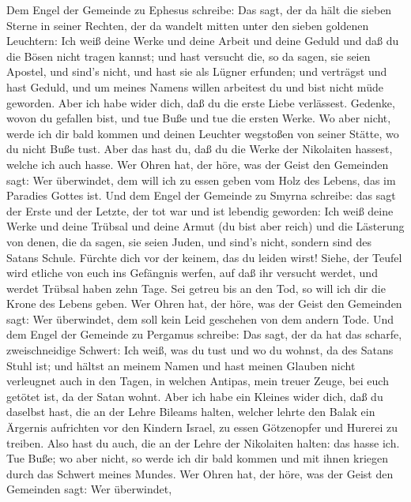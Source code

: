  Dem Engel der Gemeinde zu Ephesus schreibe: Das sagt, der
da hält die sieben Sterne in seiner Rechten, der da wandelt mitten unter
den sieben goldenen Leuchtern:  Ich weiß deine Werke und
deine Arbeit und deine Geduld und daß du die Bösen nicht tragen kannst;
und hast versucht die, so da sagen, sie seien Apostel, und sind's nicht,
und hast sie als Lügner erfunden;  und verträgst und hast
Geduld, und um meines Namens willen arbeitest du und bist nicht müde
geworden.  Aber ich habe wider dich, daß du die erste Liebe
verlässest.  Gedenke, wovon du gefallen bist, und tue Buße
und tue die ersten Werke. Wo aber nicht, werde ich dir bald kommen und
deinen Leuchter wegstoßen von seiner Stätte, wo du nicht Buße tust.
 Aber das hast du, daß du die Werke der Nikolaiten hassest,
welche ich auch hasse.  Wer Ohren hat, der höre, was der
Geist den Gemeinden sagt: Wer überwindet, dem will ich zu essen geben
vom Holz des Lebens, das im Paradies Gottes ist.  Und dem
Engel der Gemeinde zu Smyrna schreibe: das sagt der Erste und der
Letzte, der tot war und ist lebendig geworden:  Ich weiß
deine Werke und deine Trübsal und deine Armut (du bist aber reich) und
die Lästerung von denen, die da sagen, sie seien Juden, und sind's
nicht, sondern sind des Satans Schule.  Fürchte dich vor
der keinem, das du leiden wirst! Siehe, der Teufel wird etliche von euch
ins Gefängnis werfen, auf daß ihr versucht werdet, und werdet Trübsal
haben zehn Tage. Sei getreu bis an den Tod, so will ich dir die Krone
des Lebens geben.  Wer Ohren hat, der höre, was der Geist
den Gemeinden sagt: Wer überwindet, dem soll kein Leid geschehen von dem
andern Tode.  Und dem Engel der Gemeinde zu Pergamus
schreibe: Das sagt, der da hat das scharfe, zweischneidige Schwert:
 Ich weiß, was du tust und wo du wohnst, da des Satans
Stuhl ist; und hältst an meinem Namen und hast meinen Glauben nicht
verleugnet auch in den Tagen, in welchen Antipas, mein treuer Zeuge, bei
euch getötet ist, da der Satan wohnt.  Aber ich habe ein
Kleines wider dich, daß du daselbst hast, die an der Lehre Bileams
halten, welcher lehrte den Balak ein Ärgernis aufrichten vor den Kindern
Israel, zu essen Götzenopfer und Hurerei zu treiben.  Also
hast du auch, die an der Lehre der Nikolaiten halten: das hasse ich.
 Tue Buße; wo aber nicht, so werde ich dir bald kommen und
mit ihnen kriegen durch das Schwert meines Mundes.  Wer
Ohren hat, der höre, was der Geist den Gemeinden sagt: Wer überwindet,

